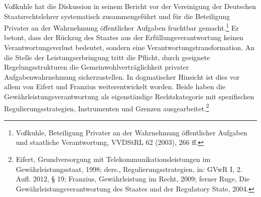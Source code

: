 \documentclass[12pt,a4paper,oneside]{book} %
\begin{document}
{	Voßkuhle hat die Diskussion in seinem Bericht vor der Vereinigung der Deutschen Staatsrechtslehrer systematisch zusammengeführt und für die Beteiligung Privater an der Wahrnehmung öffentlicher Aufgaben fruchtbar gemacht.\footnote{Voßkuhle, Beteiligung Privater an der Wahrnehmung öffentlicher Aufgaben und staatliche Verantwortung, VVDStRL 62 (2003), 266 ff.} Er betont, dass der Rückzug des Staates aus der Erfüllungsverantwortung keinen Verantwortungsverlust bedeutet, sondern eine Verantwortungstransformation. An die Stelle der Leistungserbringung tritt die Pflicht, durch geeignete Regelungsstrukturen die Gemeinwohlverträglichkeit privater Aufgabenwahrnehmung sicherzustellen. In dogmatischer Hinsicht ist dies vor allem von Eifert und Franzius weiterentwickelt worden. Beide haben die Gewährleistungsverantwortung als eigenständige Rechtskategorie mit spezifischen Regulierungsstrategien, Instrumenten und Grenzen ausgearbeitet.\footnote{Eifert, Grundversorgung mit Telekommunikationsleistungen im Gewährleistungsstaat, 1998; ders., Regulierungsstrategien, in: GVwR I, 2. Aufl. 2012, § 19; Franzius, Gewährleistung im Recht, 2009; ferner Ruge, Die Gewährleistungsverantwortung des Staates und der Regulatory State, 2004.}
	
}
\end{document}

